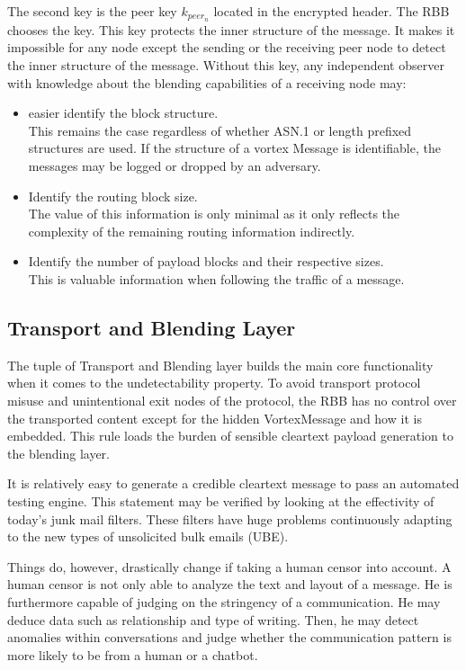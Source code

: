 \documentclass[10pt,journal,compsoc]{IEEEtran}
\begin{document}
The second key is the peer key $k_{peer_n}$ located in the encrypted header. The RBB chooses the key. This key protects the inner structure of the message. It makes it impossible for any node except the sending or the receiving peer node to detect the inner structure of the message. Without this key, any independent observer with knowledge about the blending capabilities of a receiving node may:
\begin{itemize}
	\item easier identify the block structure.\\ 
	This remains the case regardless of whether ASN.1 or length prefixed structures are used. If the structure of a vortex Message is identifiable, the messages may be logged or dropped by an adversary.
	\item Identify the routing block size.\\
	The value of this information is only minimal as it only reflects the complexity of the remaining routing information indirectly.
	\item Identify the number of payload blocks and their respective sizes. \\
	This is valuable information when following the traffic of a message.
\end{itemize}

\subsection{Transport and Blending Layer\label{sec:transportAndBlending}}
The tuple of Transport and Blending layer builds the main core functionality when it comes to the undetectability property. To avoid transport protocol misuse and unintentional exit nodes of the protocol, the RBB has no control over the transported content except for the hidden VortexMessage and how it is embedded. This rule loads the burden of sensible cleartext payload generation to the blending layer. 

It is relatively easy to generate a credible cleartext message to pass an automated testing engine. This statement may be verified by looking at the effectivity of today's junk mail filters. These filters have huge problems continuously adapting to the new types of unsolicited bulk emails (UBE).

Things do, however, drastically change if taking a human censor into account. A human censor is not only able to analyze the text and layout of a message. He is furthermore capable of judging on the stringency of a communication. He may deduce data such as relationship and type of writing. Then, he may detect anomalies within conversations and judge whether the communication pattern is more likely to be from a human or a chatbot.
\end{document}
